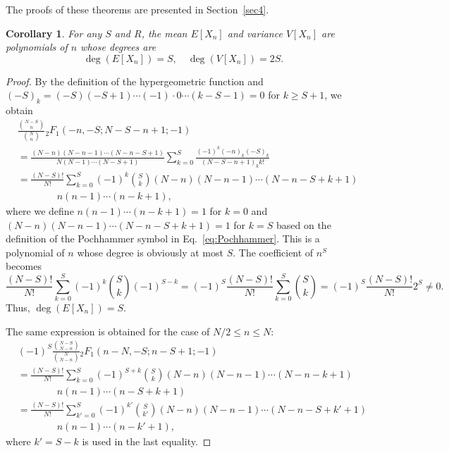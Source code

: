 \documentclass[pre, amsmath, floatfix]{revtex4-2}
\theoremstyle{plain}
\newtheorem{corollary}{Corollary}[section]
\theoremstyle{definition}
\theoremstyle{remark}
\newcommand{\E}[1]{E\left[#1\right]} %
\newcommand{\Var}[1]{V\left[#1\right]} %
\newcommand{\GaussFsymbol}{{}_2F_1} %
\newcommand{\GaussF}[4]{\GaussFsymbol\left(#1, #2; #3; #4\right)} %
\begin{document}
The proofs of these theorems are presented in Section~\ref{sec4}.

\begin{corollary}\label{cor2.1}
For any $S$ and $R$, the mean $\E{X_n}$ and variance $\Var{X_n}$ are polynomials of $n$ whose degrees are
\[
\deg(\E{X_n})=S,\quad
\deg(\Var{X_n})=2S.
\]
\end{corollary}

\begin{proof}
By the definition of the hypergeometric function and $(-S)_k=(-S)(-S+1)\cdots(-1)\cdot0\cdots(k-S-1)=0$ for $k\ge S+1$, we obtain
\begin{align*}
&\frac{\binom{N-S}{n}}{\binom{N}{n}}\GaussF{-n}{-S}{N-S-n+1}{-1}\\
&=\frac{(N-n)(N-n-1)\cdots(N-n-S+1)}{N(N-1)\cdots(N-S+1)}\sum_{k=0}^S\frac{(-1)^k(-n)_k(-S)_k}{(N-S-n+1)_k k!}\\
&=\frac{(N-S)!}{N!}\sum_{k=0}^S (-1)^k\binom{S}{k}(N-n)(N-n-1)\cdots(N-n-S+k+1)\\
&\qquad\qquad n(n-1)\cdots(n-k+1),
\end{align*}
where we define $n(n-1)\cdots(n-k+1)=1$ for $k=0$ and $(N-n)(N-n-1)\cdots(N-n-S+k+1)=1$ for $k=S$ based on the definition of the Pochhammer symbol in Eq.~\eqref{eq:Pochhammer}.
This is a polynomial of $n$ whose degree is obviously at most $S$.
The coefficient of $n^S$ becomes
\[
\frac{(N-S)!}{N!}\sum_{k=0}^S (-1)^k\binom{S}{k}(-1)^{S-k}
=(-1)^S\frac{(N-S)!}{N!}\sum_{k=0}^S \binom{S}{k}
=(-1)^S\frac{(N-S)!}{N!}2^S\ne0.
\]
Thus, $\deg(\E{X_n})=S$.

The same expression is obtained for the case of $N/2\le n\le N$:
\begin{align*}
&(-1)^S\frac{\binom{N-S}{N-n}}{\binom{N}{N-n}}\GaussF{n-N}{-S}{n-S+1}{-1}\\
&=\frac{(N-S)!}{N!}\sum_{k=0}^S (-1)^{S+k}\binom{S}{k}(N-n)(N-n-1)\cdots(N-n-k+1)\\
&\qquad\qquad n(n-1)\cdots(n-S+k+1)\\
&=\frac{(N-S)!}{N!}\sum_{k'=0}^S (-1)^{k'}\binom{S}{k'}(N-n)(N-n-1)\cdots(N-n-S+k'+1)\\
&\qquad\qquad n(n-1)\cdots(n-k'+1),
\end{align*}
where $k'=S-k$ is used in the last equality.


\end{proof}
\end{document}
